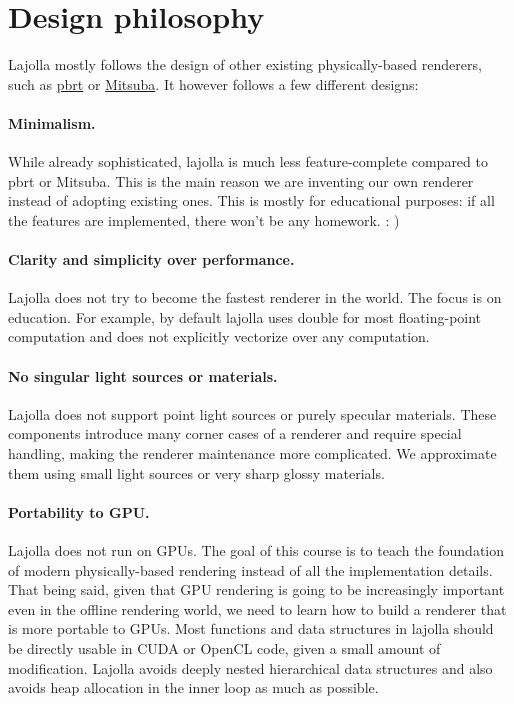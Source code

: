 \section{Design philosophy}

Lajolla mostly follows the design of other existing physically-based renderers, such as \href{https://github.com/mmp/pbrt-v3/}{pbrt} or \href{http://www.mitsuba-renderer.org/}{Mitsuba}. It however follows a few different designs:

\paragraph{Minimalism.} While already sophisticated, lajolla is much less feature-complete compared to pbrt or Mitsuba. This is the main reason we are inventing our own renderer instead of adopting existing ones. This is mostly for educational purposes: if all the features are implemented, there won't be any homework. : )

\paragraph{Clarity and simplicity over performance.} Lajolla does not try to become the fastest renderer in the world. The focus is on education. For example, by default lajolla uses double for most floating-point computation and does not explicitly vectorize over any computation.

\paragraph{No singular light sources or materials.} Lajolla does not support point light sources or purely specular materials. These components introduce many corner cases of a renderer and require special handling, making the renderer maintenance more complicated. We approximate them using small light sources or very sharp glossy materials.

\paragraph{Portability to GPU.} Lajolla does not run on GPUs. The goal of this course is to teach the foundation of modern physically-based rendering instead of all the implementation details. That being said, given that GPU rendering is going to be increasingly important even in the offline rendering world, we need to learn how to build a renderer that is more portable to GPUs. Most functions and data structures in lajolla should be directly usable in CUDA or OpenCL code, given a small amount of modification. Lajolla avoids deeply nested hierarchical data structures and also avoids heap allocation in the inner loop as much as possible.

